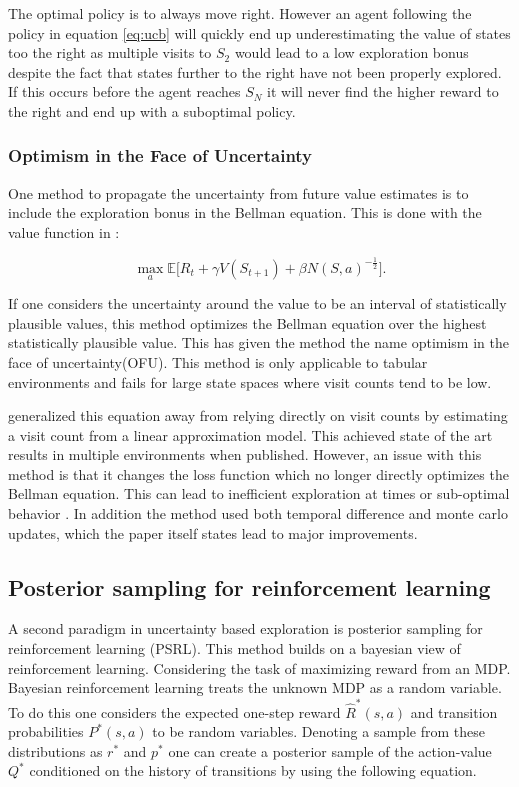 The optimal policy is to always move right. However an agent following the policy in equation \ref{eq:ucb} will quickly end up underestimating the value of states too the right as multiple visits to $S_2$ would lead to a low exploration bonus despite the fact that states further to the right have not been properly explored. If this occurs before the agent reaches $S_N$ it will never find the higher reward to the right and end up with a suboptimal policy.

\subsubsection{Optimism in the Face of Uncertainty}

One method to propagate the uncertainty from future value estimates is to include the exploration bonus in the Bellman equation. This is done with the value function in \cite{strehl_2008}:

\begin{equation}
    \max_a \mathbb{E}\Big[R_t+\gamma V(S_{t+1})+\beta N(S,a)^{-\frac{1}{2}}\Big].
\end{equation}

If one considers the uncertainty around the value to be an interval of statistically plausible values, this method optimizes the Bellman equation over the highest statistically plausible value. This has given the method the name optimism in the face of uncertainty(OFU). This method is only applicable to tabular environments and fails for large state spaces where visit counts tend to be low.

\cite{bellemare_2016} generalized this equation away from relying directly on visit counts by estimating a visit count from a linear approximation model. This achieved state of the art results in multiple environments when published. However, an issue with this method is that it changes the loss function which no longer directly optimizes the Bellman equation. This can lead to inefficient exploration at times or sub-optimal behavior \citep{moerland_2017}. In addition the method used both temporal difference and monte carlo updates, which the paper itself states lead to major improvements.

\subsection{Posterior sampling for reinforcement learning}

A second paradigm in uncertainty based exploration is posterior sampling for reinforcement learning (PSRL). This method builds on a bayesian view of reinforcement learning. Considering the task of maximizing reward from an MDP. Bayesian reinforcement learning treats the unknown MDP as a random variable. To do this one considers the expected one-step reward $\hat{R}^*(s,a)$ and transition probabilities $P^*(s,a)$ to be random variables. Denoting a sample from these distributions as $r^*$ and $p^*$ one can create a posterior sample of the action-value $Q^*$ conditioned on the history of transitions by using the following equation. 

